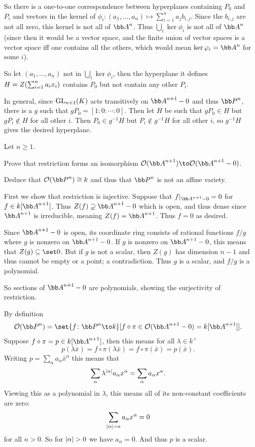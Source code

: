     So there is a one-to-one correspondence between hyperplanes containing $P_0$ and $P_i$ and vectors in the kernel of $\phi_i\colon(a_1,\dots,a_n)\mapsto\sum_{i=1}^na_jb_{i,j}$.
    Since the $b_{i,j}$ are not all zero, this kernel is not all of $\bA^n$.
    Thus $\bigcup_i\ker\phi_i$ is not all of $\bA^n$ (since then it would be a vector space, and the finite union of vector spaces is a vector space iff one contains all the others, which would mean
    $\ker\phi_i=\bA^n$ for some $i$).

    So let $(a_1,\dots,a_n)$ not in $\bigcup_i\ker\phi_i$, then the hyperplane it defines $H=Z\mathopen{}\mathclose{\left(\sum_{i=1}^na_ix_i\right)}$ contains $P_0$ but not contain any other $P_i$.

    In general, since ${\rm GL}_{n+1}(K)$ acts transitively on $\bA^{n+1}-0$ and thus $\bP^n$, there is a $g$ such that $gP_0=[1:0:\cdots:0]$.
    Then let $H$ be such that $gP_0\in H$ but $gP_i\notin H$ for all other $i$.
    Then $P_0\in g^{-1}H$ but $P_i\notin g^{-1}H$ for all other $i$, so $g^{-1}H$ gives the desired hyperplane.
\eenum

\bprob

    Let $n\geq1$.
    \benum
        \item Prove that restriction forms an isomorphism $\O(\bA^{n+1})\to\O(\bA^{n+1}-0)$.
        \item Deduce that $\O(\bP^n)\cong k$ and thus that $\bP^n$ is not an affine variety.
    \eenum

\eprob

\benum
    \item First we show that restriction is injective.
    Suppose that $f|_{\bA^{n+1}-0}=0$ for $f\in k[\bA^{n+1}]$.
    Thus $Z(f)\supseteq\bA^{n+1}-0$ which is open, and thus dense since $\bA^{n+1}$ is irreducible, meaning $Z(f)=\bA^{n+1}$.
    Thus $f=0$ as desired.

    Since $\bA^{n+1}-0$ is open, its coordinate ring consists of rational functions $f/g$ where $g$ is nonzero on $\bA^{n+1}-0$.
    If $g$ is nonzero on $\bA^{n+1}-0$, this means that $Z(g)\subseteq\set0$.
    But if $g$ is not a scalar, then $Z(g)$ has dimension $n-1$ and thus cannot be empty or a point; a contradiction.
    Thus $g$ is a scalar, and $f/g$ is a polynomial.

    So sections of $\bA^{n+1}-0$ are polynomials, showing the surjectivity of restriction.

    \item By definition
    $$ \O(\bP^n) = \set{f\colon\bP^n\to k}[{f\circ\pi\in\O(\bA^{n+1}-0)=k[\bA^{n+1}]}] . $$
    Suppose $f\circ\pi=p\in k[\bA^{n+1}]$, then this means for all $\lambda\in k^\times$
    $$ p(\lambda\bar x) = f\circ\pi(\lambda\bar x) = f\circ\pi(\bar x) = p(\bar x) . $$
    Writing $p=\sum_\alpha a_\alpha\bar x^\alpha$ this means that
    $$ \sum_\alpha \lambda^{\mathopen{}\mathclose{\left|\alpha\right|}}a_\alpha x^\alpha = \sum_\alpha a_\alpha x^\alpha . $$
    Viewing this as a polynomial in $\lambda$, this means all of its non-constant coefficients are zero:
    $$ \sum_{\mathopen{}\mathclose{\left|\alpha\right|}=n}a_\alpha x^\alpha = 0 $$
    for all $n>0$.
    So for $\mathopen{}\mathclose{\left|\alpha\right|}>0$ we have $a_\alpha=0$.
    And thus $p$ is a scalar.

